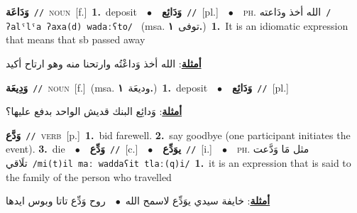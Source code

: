 \documentclass[10pt,a4paper,twoside]{article} %
\begin{document}
\begin{multicols}{2}
{\setlength\topsep{0pt}\textbf{\foreignlanguage{arabic}{وَدَاعَة}}\ {\color{gray}\texttt{//}\color{black}}\ \textsc{noun}\ [f.]\ \textbf{1.}~deposit\ \ $\bullet$\ \ \setlength\topsep{0pt}\textbf{\foreignlanguage{arabic}{وَدَائِع}}\ {\color{gray}\texttt{//}\color{black}}\ [pl.]\ \ $\bullet$\ \ \textsc{ph.} \color{gray} \foreignlanguage{arabic}{الله أخذ ودَاعته}\color{black}\ {\color{gray}\texttt{/{\sffamily ʔalˤlˤa ʔaxa(d) wadaːʕto}/}\color{black}}\ \color{gray} (msa. \foreignlanguage{arabic}{توفى}~\foreignlanguage{arabic}{\textbf{١.}})\color{black}\ \textbf{1.}~It is an idiomatic expression that means that sb passed away\  \begin{flushright}\color{gray}\foreignlanguage{arabic}{\textbf{\underline{\foreignlanguage{arabic}{أمثلة}}}: الله أخذ وَداعْتُه وارتحنا منه وهو ارتاح أكيد}\end{flushright}\color{black}} \vspace{2mm}

{\setlength\topsep{0pt}\textbf{\foreignlanguage{arabic}{وَدِيعَة}}\ {\color{gray}\texttt{//}\color{black}}\ \textsc{noun}\ [f.]\ \color{gray}(msa. \foreignlanguage{arabic}{وديعَة}~\foreignlanguage{arabic}{\textbf{١.}})\color{black}\ \textbf{1.}~deposit\ \ $\bullet$\ \ \setlength\topsep{0pt}\textbf{\foreignlanguage{arabic}{وَدَائِع}}\ {\color{gray}\texttt{//}\color{black}}\ [pl.]\  \begin{flushright}\color{gray}\foreignlanguage{arabic}{\textbf{\underline{\foreignlanguage{arabic}{أمثلة}}}: وَدائِع البنك قديش الواحد بدفع عليها؟}\end{flushright}\color{black}} \vspace{2mm}

{\setlength\topsep{0pt}\textbf{\foreignlanguage{arabic}{وَدَّع}}\ {\color{gray}\texttt{//}\color{black}}\ \textsc{verb}\ [p.]\ \textbf{1.}~bid farewell.  \textbf{2.}~say goodbye (one participant initiates the event).  \textbf{3.}~die\ \ $\bullet$\ \ \setlength\topsep{0pt}\textbf{\foreignlanguage{arabic}{وَدِّع}}\ {\color{gray}\texttt{//}\color{black}}\ [c.]\ \ $\bullet$\ \ \setlength\topsep{0pt}\textbf{\foreignlanguage{arabic}{يوَدِّع}}\ {\color{gray}\texttt{//}\color{black}}\ [i.]\ \ $\bullet$\ \ \textsc{ph.} \color{gray} \foreignlanguage{arabic}{مثل مَا وَدَّعت تلَاقي}\color{black}\ {\color{gray}\texttt{/{\sffamily mi(t)il maː waddaʕit tlaː(q)i}/}\color{black}}\ \textbf{1.}~it is an expression that is said to the family of the person who travelled\  \begin{flushright}\color{gray}\foreignlanguage{arabic}{\textbf{\underline{\foreignlanguage{arabic}{أمثلة}}}: خايفة سيدي يوَدِّع لاسمح الله\ $\bullet$\ \  روح وَدِّع تاتا وبوس ايدها}\end{flushright}\color{black}} \vspace{2mm}


\end{multicols}
\end{document}
